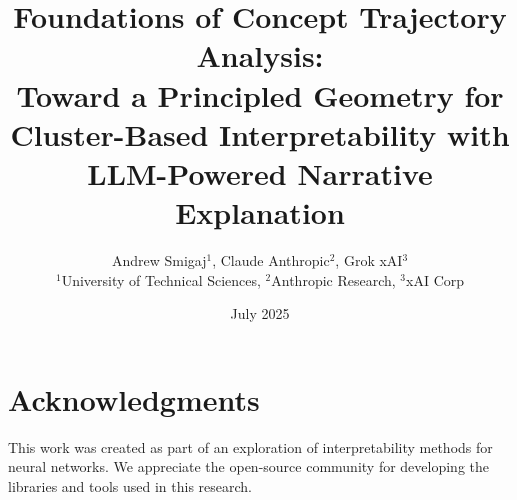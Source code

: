 \documentclass[11pt,a4paper]{article}
\title{Foundations of Concept Trajectory Analysis: \\
Toward a Principled Geometry for Cluster-Based Interpretability with LLM-Powered Narrative Explanation}
\author{Andrew Smigaj$^1$, Claude Anthropic$^2$, Grok xAI$^3$ \\
$^1$University of Technical Sciences, $^2$Anthropic Research, $^3$xAI Corp}
\date{July 2025}
\begin{document}
\maketitle





























\section*{Acknowledgments}
This work was created as part of an exploration of interpretability methods for neural networks. We appreciate the open-source community for developing the libraries and tools used in this research.



\end{document}

